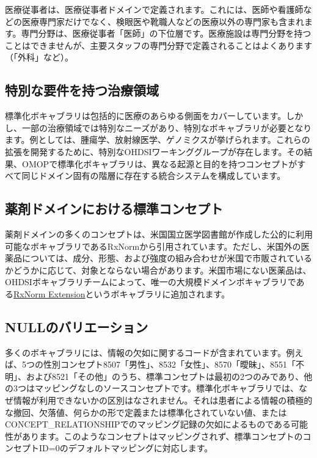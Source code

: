 \documentclass[
  11pt]{book}
\theoremstyle{definition}
\theoremstyle{definition}
\theoremstyle{definition}
\theoremstyle{definition}
\theoremstyle{remark}
\begin{document}
医療従事者は、医療従事者ドメインで定義されます。これには、医師や看護師などの医療専門家だけでなく、検眼医や靴職人などの医療以外の専門家も含まれます。専門分野は、医療従事者「医師」の下位層です。医療施設は専門分野を持つことはできませんが、主要スタッフの専門分野で定義されることはよくあります（「外科」など）。

\subsection{特別な要件を持つ治療領域}\label{ux7279ux5225ux306aux8981ux4ef6ux3092ux6301ux3064ux6cbbux7642ux9818ux57df}

標準化ボキャブラリは包括的に医療のあらゆる側面をカバーしています。しかし、一部の治療領域では特別なニーズがあり、特別なボキャブラリが必要となります。例としては、腫瘍学、放射線医学、ゲノミクスが挙げられます。これらの拡張を開発するために、特別なOHDSIワーキンググループが存在します。その結果、OMOPで標準化ボキャブラリは、異なる起源と目的を持つコンセプトがすべて同じドメイン固有の階層に存在する統合システムを構成しています。

\subsection{薬剤ドメインにおける標準コンセプト}\label{rxNormExtension}

薬剤ドメインの多くのコンセプトは、米国国立医学図書館が作成した公的に利用可能なボキャブラリであるRxNormから引用されています。ただし、米国外の医薬品については、成分、形態、および強度の組み合わせが米国で市販されているかどうかに応じて、対象とならない場合があります。米国市場にない医薬品は、OHDSIボキャブラリチームによって、唯一の大規模ドメインボキャブラリである\href{https://www.ohdsi.org/web/wiki/doku.php?id=documentation:vocabulary:rxnorm_extension}{RxNorm Extension}というボキャブラリに追加されます。

\subsection{NULLのバリエーション}\label{nullux306eux30d0ux30eaux30a8ux30fcux30b7ux30e7ux30f3}

多くのボキャブラリには、情報の欠如に関するコードが含まれています。例えば、5つの性別コンセプト8507「男性」、8532「女性」、8570「曖昧」、8551「不明」、および8521「その他」のうち、標準コンセプトは最初の2つのみであり、他の3つはマッピングなしのソースコンセプトです。標準化ボキャブラリでは、なぜ情報が利用できないかの区別はなされません。それは患者による情報の積極的な撤回、欠落値、何らかの形で定義または標準化されていない値、またはCONCEPT\_RELATIONSHIPでのマッピング記録の欠如によるものである可能性があります。このようなコンセプトはマッピングされず、標準コンセプトのコンセプトID=0のデフォルトマッピングに対応します。
\end{document}
